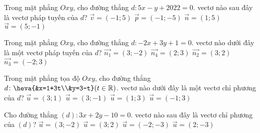 \begin{ex}%
	Trong mặt phẳng $Oxy$, cho đường thẳng $d\colon 5x-y+2022=0$. vectơ nào sau đây là vectơ pháp tuyến của $d$?
	\choice
	{$\overrightarrow{v}=\left(-1;5\right)$}
	{$\overrightarrow{p}=\left(-1;-5\right)$}
	{$\overrightarrow{n}=\left(1;5\right)$}
	{\True $\overrightarrow{u}=\left(5;-1\right)$}
\end{ex}


\begin{ex}%
	Trong mặt phẳng $Oxy$, cho đường thẳng $d: -2x+3y+1=0$. vectơ nào dưới đây là một vectơ pháp tuyến của $d$?
	\choice
	{$\overrightarrow{n_1}=(3;-2)$}
	{$\overrightarrow{n_4}=(2;3)$}
	{$\overrightarrow{n_2}=(3;2)$}
	{\True $\overrightarrow{n_3}=(-2;3)$}
\end{ex}


\begin{ex}%
	Trong mặt phẳng tọa độ $O x y$, cho đường thẳng $d\colon \heva{&x=1+3t\\&y=3-t} (t \in \mathbb{R})$. vectơ nào dưới đây là một vectơ chỉ phương của $d$?
	\choice
	{$\overrightarrow{u}=(3; 1)$}
	{\True $\overrightarrow{u}=(3;-1)$}
	{$\overrightarrow{u}=(1; 3)$}
	{$\overrightarrow{u}=(-1; 3)$}
	\loigiai{
	}
\end{ex}


\begin{ex}%
	Cho đường thẳng $(d)\colon 3x+2y-10=0$. vectơ  nào sau đây là vectơ chỉ phương của $(d)$?
	\choice
	{$\overrightarrow{u}=(3;-2) $}
	{$\overrightarrow{u}=(3;2) $}
	{$\overrightarrow{u}=(-2;-3) $}
	{\True $\overrightarrow{u}=(2;-3) $}
\end{ex}


